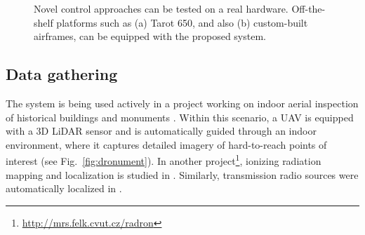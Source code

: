 \documentclass[a4paper,11pt,titlepage,twoside]{book}
\newcommand{\reffig}[1]{Fig.~\ref{#1}}
\begin{document}
\begin{figure}
{}
    \caption{Novel control approaches can be tested on a real hardware. Off-the-shelf platforms such as (a) Tarot 650, and also (b) custom-built airframes, can be equipped with the proposed system.}
    \label{fig:control}
  \end{figure}

  \subsection{Data gathering}

  The system is being used actively in a project working on indoor aerial inspection of historical buildings and monuments \cite{petracek2020dronument, saska2017documentation, kratky2020autonomous}.
  Within this scenario, a \ac{UAV} is equipped with a 3D \ac{LiDAR} sensor and is automatically guided through an indoor environment, where it captures detailed imagery of hard-to-reach points of interest (see \reffig{fig:dronument}).
  In another project\footnote{\url{http://mrs.felk.cvut.cz/radron}}, ionizing radiation mapping and localization is studied in \cite{baca2018rospix, baca2019timepix, stibinger2020localization}.
  Similarly, transmission radio sources were automatically localized in \cite{vrba2019realtime}.
\end{document}
